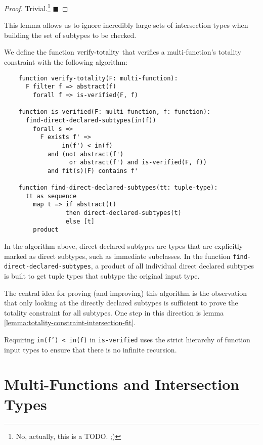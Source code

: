 \begin{proof}
	Trivial.\footnote{No, actually, this is a TODO. ;)} $\blacksquare$
\end{proof}

\noindent This lemma allows us to ignore incredibly large sets of intersection types when building the set of subtypes to be checked.

\begin{definition} \label{def:totality-constraint-verification-algorithm}
	We define the function $\operatorname{verify-totality}$ that verifies a multi-function's totality constraint with the following algorithm:
	
	\begin{lstlisting}
    function verify-totality(F: multi-function):
      F filter f => abstract(f)
        forall f => is-verified(F, f)
      
    function is-verified(F: multi-function, f: function):
      find-direct-declared-subtypes(in(f))
        forall s => 
          F exists f' => 
                in(f') < in(f)
            and (not abstract(f') 
                  or abstract(f') and is-verified(F, f))
            and fit(s)(F) contains f'
    
    function find-direct-declared-subtypes(tt: tuple-type):
      tt as sequence
        map t => if abstract(t) 
                 then direct-declared-subtypes(t) 
                 else [t]
        product
	\end{lstlisting}
\end{definition}

\noindent In the algorithm above, direct declared subtypes are types that are explicitly marked as direct subtypes, such as immediate subclasses. In the function \texttt{find-direct-declared-subtypes}, a product of all individual direct declared subtypes is built to get tuple types that subtype the original input type.

The central idea for proving (and improving) this algorithm is the observation that only looking at the directly declared subtypes is sufficient to prove the totality constraint for all subtypes. One step in this direction is lemma \ref{lemma:totality-constraint-intersection-fit}.

Requiring \texttt{in(f') < in(f)} in \texttt{is-verified} uses the strict hierarchy of function input types to ensure that there is no infinite recursion.



\section{Multi-Functions and Intersection Types}

